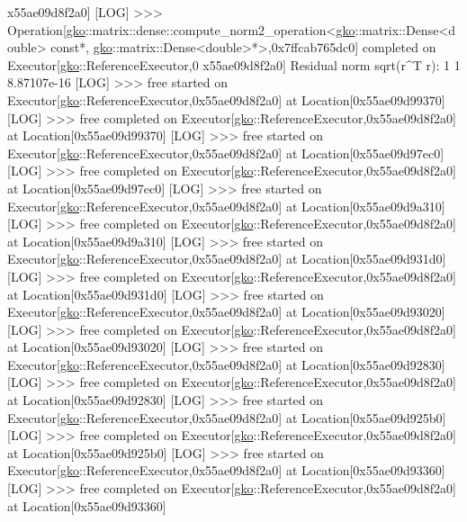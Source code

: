 \begin{DoxyCode}
      x55ae09d8f2a0]
[LOG] >>> Operation[\hyperlink{namespacegko}{gko}::matrix::dense::compute\_norm2\_operation<\hyperlink{namespacegko}{gko}::matrix::Dense<double> const*, 
      \hyperlink{namespacegko}{gko}::matrix::Dense<double>*>,0x7ffcab765dc0] completed on Executor[\hyperlink{namespacegko}{gko}::ReferenceExecutor,0
      x55ae09d8f2a0]
Residual norm sqrt(r^T r):
1 1
8.87107e-16
[LOG] >>> free started on Executor[\hyperlink{namespacegko}{gko}::ReferenceExecutor,0x55ae09d8f2a0] at Location[0x55ae09d99370]
[LOG] >>> free completed on Executor[\hyperlink{namespacegko}{gko}::ReferenceExecutor,0x55ae09d8f2a0] at Location[0x55ae09d99370]
[LOG] >>> free started on Executor[\hyperlink{namespacegko}{gko}::ReferenceExecutor,0x55ae09d8f2a0] at Location[0x55ae09d97ec0]
[LOG] >>> free completed on Executor[\hyperlink{namespacegko}{gko}::ReferenceExecutor,0x55ae09d8f2a0] at Location[0x55ae09d97ec0]
[LOG] >>> free started on Executor[\hyperlink{namespacegko}{gko}::ReferenceExecutor,0x55ae09d8f2a0] at Location[0x55ae09d9a310]
[LOG] >>> free completed on Executor[\hyperlink{namespacegko}{gko}::ReferenceExecutor,0x55ae09d8f2a0] at Location[0x55ae09d9a310]
[LOG] >>> free started on Executor[\hyperlink{namespacegko}{gko}::ReferenceExecutor,0x55ae09d8f2a0] at Location[0x55ae09d931d0]
[LOG] >>> free completed on Executor[\hyperlink{namespacegko}{gko}::ReferenceExecutor,0x55ae09d8f2a0] at Location[0x55ae09d931d0]
[LOG] >>> free started on Executor[\hyperlink{namespacegko}{gko}::ReferenceExecutor,0x55ae09d8f2a0] at Location[0x55ae09d93020]
[LOG] >>> free completed on Executor[\hyperlink{namespacegko}{gko}::ReferenceExecutor,0x55ae09d8f2a0] at Location[0x55ae09d93020]
[LOG] >>> free started on Executor[\hyperlink{namespacegko}{gko}::ReferenceExecutor,0x55ae09d8f2a0] at Location[0x55ae09d92830]
[LOG] >>> free completed on Executor[\hyperlink{namespacegko}{gko}::ReferenceExecutor,0x55ae09d8f2a0] at Location[0x55ae09d92830]
[LOG] >>> free started on Executor[\hyperlink{namespacegko}{gko}::ReferenceExecutor,0x55ae09d8f2a0] at Location[0x55ae09d925b0]
[LOG] >>> free completed on Executor[\hyperlink{namespacegko}{gko}::ReferenceExecutor,0x55ae09d8f2a0] at Location[0x55ae09d925b0]
[LOG] >>> free started on Executor[\hyperlink{namespacegko}{gko}::ReferenceExecutor,0x55ae09d8f2a0] at Location[0x55ae09d93360]
[LOG] >>> free completed on Executor[\hyperlink{namespacegko}{gko}::ReferenceExecutor,0x55ae09d8f2a0] at Location[0x55ae09d93360]
\end{DoxyCode}


